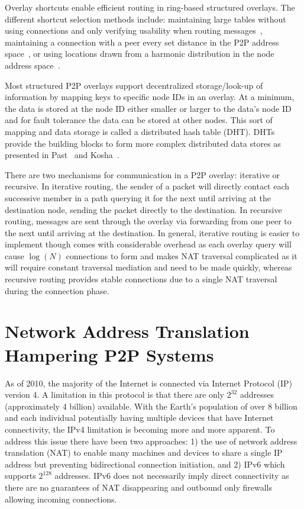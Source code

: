 Overlay shortcuts enable efficient routing in ring-based structured overlays.
The different shortcut selection methods include: maintaining large tables
without using connections and only verifying usability when routing
messages~\cite{pastry, kademlia}, maintaining a connection with a peer every
set distance in the P2P address space~\cite{chord}, or using locations drawn
from a harmonic distribution in the node address space~\cite{symphony}.

Most structured P2P overlays support decentralized storage/look-up of
information by mapping keys to specific node IDs in an overlay.  At a
minimum, the data is stored at the node ID either smaller or larger to the
data's node ID and for fault tolerance the data can be stored at other nodes.
This sort of mapping and data storage is called a distributed hash table (DHT).
DHTs provide the building blocks to form more complex distributed data stores
as presented in Past~\cite{past} and Kosha~\cite{kosha}.

There are two mechanisms for communication  in a P2P overlay: iterative or
recursive.  In iterative routing, the sender of a packet will directly contact
each successive member in a path querying it for the next until arriving at the
destination node, sending the packet directly to the destination.  In recursive
routing, messages are sent through the overlay via forwarding from one peer to
the next until arriving at the destination.  In general, iterative routing is
easier to implement though comes with considerable overhead as each overlay
query will cause $\log(N)$ connections to form and makes NAT traversal
complicated as it will require constant traversal mediation and need to be made
quickly, whereas recursive routing provides stable connections due to a single
NAT traversal during the connection phase.

\section{Network Address Translation Hampering P2P Systems}
As of 2010, the majority of the Internet is connected via Internet Protocol (IP)
version 4.  A limitation in this protocol is that there are only $2^{32}$
addresses (approximately 4 billion) available.  With the Earth's population of
over 8 billion and each individual potentially having multiple devices that
have Internet connectivity, the IPv4 limitation is becoming more and more
apparent.  To address this issue there have been two approaches:  1) the use of
network address translation (NAT) to enable many machines and devices to share
a single IP address but preventing bidirectional connection initiation, and 2)
IPv6 which supports $2^{128}$ addresses.  IPv6 does not necessarily imply
direct connectivity as there are no guarantees of NAT disappearing and outbound
only firewalls allowing incoming connections.


